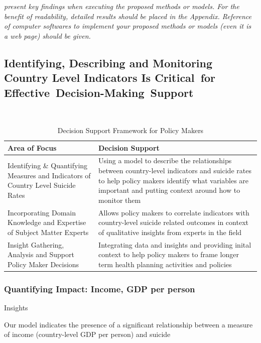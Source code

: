 \documentclass[]{article}
\begin{document}
\emph{present key findings when executing the proposed methods or
models. For the benefit of readability, detailed results should be
placed in the Appendix. Reference of computer softwares to implement
your proposed methods or models (even it is a web page) should be
given.}

\subsection{Identifying, Describing and Monitoring Country Level
Indicators Is Critical~for
Effective~Decision-Making~Support}\label{identifying-describing-and-monitoring-country-level-indicators-is-criticalfor-effectivedecision-makingsupport}

\begin{table}[H]
\centering 
\caption{Decision Support Framework for Policy Makers}
\
\begin{tabular}{p{5cm}p{10cm}}  
\hline  
   Area of Focus  & Decision Support  \\   
\hline 
 Identifying \& Quantifying Measures and Indicators of Country Level Suicide Rates &  Using a model to describe the relationships between country-level indicators and suicide rates to help policy makers identify what variables are important and putting context around how to monitor them \\   
 \hline 
Incorporating Domain Knowledge and Expertise of Subject Matter Experts & Allows policy makers to correlate indicators with country-level suicide related outcomes in context of qualitative insights from experts in the field \\   
\hline 
Insight Gathering, Analysis and Support Policy Maker Decisions & Integrating data and insights and providing inital context to help policy makers to frame longer term health planning activities and policies \\
\hline 
\end{tabular} 
\end{table}

\subsubsection{Quantifying Impact: Income, GDP per
person}\label{quantifying-impact-income-gdp-per-person}

Insights

Our model indicates the presence of a significant relationship between a
measure of income (country-level GDP per person) and suicide~
\end{document}
